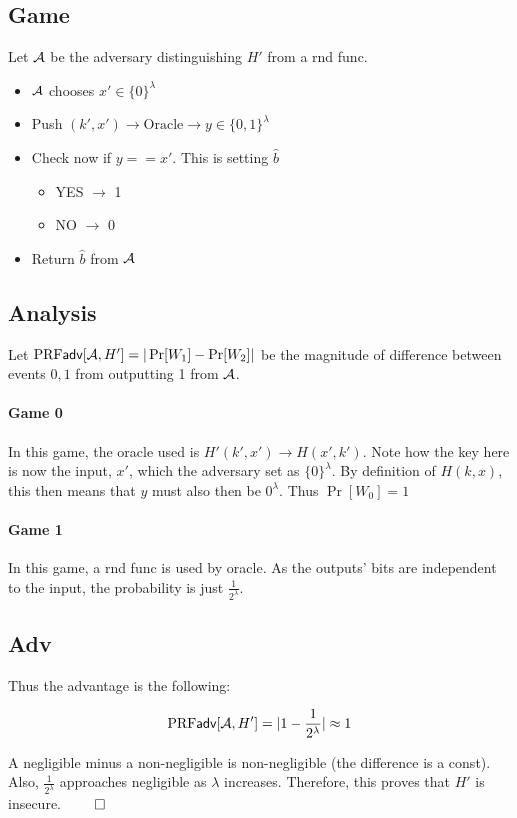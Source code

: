 \documentclass[12pt]{article}
\theoremstyle{plain}
\theoremstyle{definition}
\begin{document}
\begin{problem}
\begin{solution}
\subsection*{Game}
Let $\mathcal{A}$ be the adversary distinguishing $H'$ from a rnd func.

\begin{itemize}
  \item $\mathcal{A}$ chooses $x' \in \{0\}^{\lambda}$
  \item Push $(k', x') \to \text{Oracle} \to y \in \{0, 1\}^{\lambda}$
  \item Check now if $y == x'$. This is setting $\hat{b}$
  \begin{itemize}
    \item YES $\to$ 1
    \item NO $\to$ 0
  \end{itemize}
  \item Return $\hat{b}$ from $\mathcal{A}$
\end{itemize}

\subsection*{Analysis}
Let $\textrm{PRF}\textsf{adv}[\mathcal{A}, H'] = |\Pr[W_1] - \Pr[W_2]|$ be the magnitude of difference between events $0, 1$ from outputting 1 from $\mathcal{A}$.

\paragraph{Game 0}  In this game, the oracle used is $H'(k', x') \to H(x', k')$. Note how the key here is now the input, $x'$, which the adversary set as $\{0\}^{\lambda}$.
By definition of $H(k, x)$, this then means that $y$ must also then be $0^{\lambda}$. Thus $\Pr[W_0] = 1$

\paragraph{Game 1}  In this game, a rnd func is used by oracle. As the outputs' bits are independent to the input, the probability is just $\frac{1}{2^{\lambda}}$.

\subsection*{Adv}
Thus the advantage is the following:

\begin{equation*}
  \textrm{PRF}\textsf{adv}[\mathcal{A}, H'] = |1 - \frac{1}{2^{\lambda}}| \approx 1
\end{equation*}

\noindent A negligible minus a non-negligible is non-negligible (the difference is a const). Also, $\frac{1}{2^{\lambda}}$ approaches negligible as $\lambda$ increases.
Therefore, this proves that $H'$ is insecure. $\qed$
\end{solution}
 
\end{problem} 
 
\end{document}
